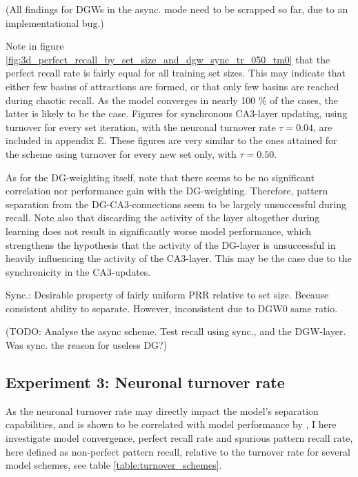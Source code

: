 (All findings for DGWs in the async. mode need to be scrapped so far, due to an implementational bug.)

Note in figure \ref{fig:3d_perfect_recall_by_set_size_and_dgw_sync_tr_050_tm0} that the perfect recall rate is fairly equal for all training set sizes. This may indicate that either few basins of attractions are formed, or that only few basins are reached during chaotic recall. As the model converges in nearly 100 \% of the cases, the latter is likely to be the case. Figures for synchronous CA3-layer updating, using turnover for every set iteration, with the neuronal turnover rate $\tau=0.04$, are included in appendix E. These figures are very similar to the ones attained for the scheme using turnover for every new set only, with $\tau=0.50$.

As for the DG-weighting itself, note that there seems to be no significant correlation nor performance gain with the DG-weighting. Therefore, pattern separation from the DG-CA3-connections seem to be largely unsuccessful during recall. 
Note also that discarding the activity of the layer altogether during learning does not result in significantly worse model performance, which strengthens the hypothesis that the activity of the DG-layer is unsuccessful in heavily influencing the activity of the CA3-layer. 
This may be the case due to the synchronicity in the CA3-updates.

Sync.: Desirable property of fairly uniform PRR relative to set size. Because consistent ability to separate. However, inconsistent due to DGW0 same ratio.

(TODO: Analyse the async scheme. Test recall using sync., and the DGW-layer. Was sync. the reason for useless DG?)



\subsection{Experiment 3: Neuronal turnover rate}

As the neuronal turnover rate may directly impact the model's separation capabilities, and is shown to be correlated with model performance by \citep{Hattori2014}, I here investigate model convergence, perfect recall rate and spurious pattern recall rate, here defined as non-perfect pattern recall, relative to the turnover rate for several model schemes, see table \ref{table:turnover_schemes}.


